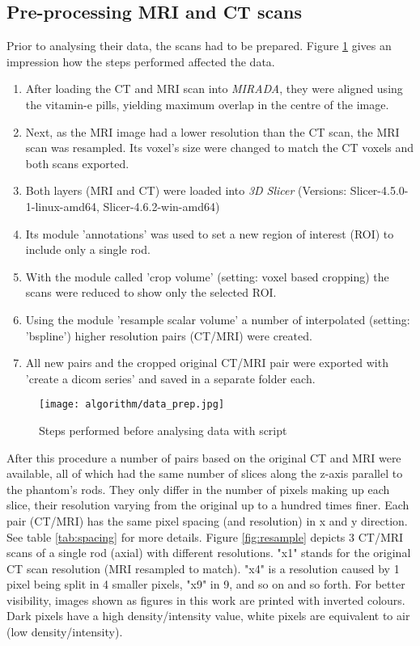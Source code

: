 \subsection{Pre-processing MRI and CT scans}
\label{sec:prep}

Prior to analysing their data, the scans had to be prepared.
Figure \ref{fig:data_prep} gives an impression how the steps performed affected the data.

\begin{enumerate}[label=\textbf{Step \arabic*}]
\item After loading the CT and MRI scan into \textit{MIRADA}, they were aligned using the vitamin-e pills, yielding maximum overlap in the centre of the image.
\item Next, as the MRI image had a lower resolution than the CT scan, the MRI scan was resampled.
Its voxel's size were changed to match the CT voxels and both scans exported.
\item Both layers (MRI and CT) were loaded into \textit{3D Slicer} (Versions: Slicer-4.5.0-1-linux-amd64, Slicer-4.6.2-win-amd64)
\item Its module 'annotations' was used to set a new region of interest (ROI) to include only a single rod.
\item With the module called 'crop volume' (setting: voxel based cropping) the scans were reduced to show only the selected ROI.
\item Using the module 'resample scalar volume' a number of interpolated (setting: 'bspline') higher resolution pairs (CT/MRI) were created.
\item All new pairs and the cropped original CT/MRI pair were exported with 'create a dicom series' and saved in a separate folder each.
\end{enumerate}

\begin{figure}[!tbp]
\centering
\texttt{[image: algorithm/data\_prep.jpg]}
\caption{Steps performed before analysing data with script}
\label{fig:data_prep}
\end{figure}

After this procedure a number of pairs based on the original CT and MRI were available, all of which had the same number of slices along the z-axis parallel to the phantom's rods.
They only differ in the number of pixels making up each slice, their resolution varying from the original up to a hundred times finer.
Each pair (CT/MRI) has the same pixel spacing (and resolution) in x and y direction.
See table \ref{tab:spacing} for more details.
Figure \ref{fig:resample} depicts 3 CT/MRI scans of a single rod (axial) with different resolutions.
"x1" stands for the original CT scan resolution (MRI resampled to match).
"x4" is a resolution caused by 1 pixel being split in 4 smaller pixels, "x9" in 9, and so on and so forth.
For better visibility, images shown as figures in this work are printed with inverted colours.
Dark pixels have a high density/intensity value, white pixels are equivalent to air (low density/intensity).

